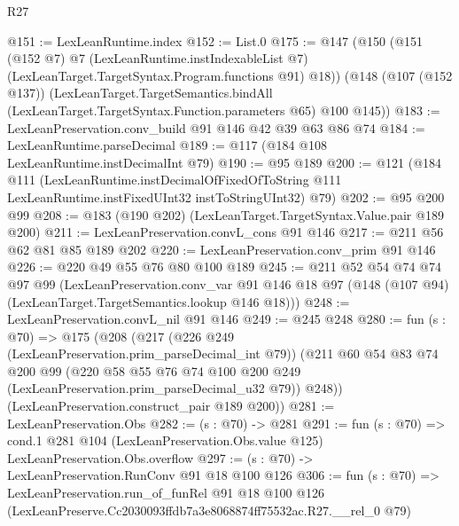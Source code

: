 \begin{lexlean}{R27}
\begin{coremodule}
@151 := LexLeanRuntime.index
@152 := List.{0}
@175 := @147
    (@150
      (@151
        (@152 @7)
        @7
        (LexLeanRuntime.instIndexableList @7)
        (LexLeanTarget.TargetSyntax.Program.functions @91)
        @18))
    (@148
      (@107 (@152 @137))
      (LexLeanTarget.TargetSemantics.bindAll
        (LexLeanTarget.TargetSyntax.Function.parameters @65)
        @100
        @145))
@183 := LexLeanPreservation.conv_build @91 @146 @42 @39 @63 @86 @74
@184 := LexLeanRuntime.parseDecimal
@189 := @117 (@184 @108 LexLeanRuntime.instDecimalInt @79)
@190 := @95 @189
@200 := @121
    (@184
      @111
      (LexLeanRuntime.instDecimalOfFixedOfToString
        @111
        LexLeanRuntime.instFixedUInt32
        instToStringUInt32)
      @79)
@202 := @95 @200 @99
@208 := @183 (@190 @202) (LexLeanTarget.TargetSyntax.Value.pair @189 @200)
@211 := LexLeanPreservation.convL_cons @91 @146
@217 := @211 @56 @62 @81 @85 @189 @202
@220 := LexLeanPreservation.conv_prim @91 @146
@226 := @220 @49 @55 @76 @80 @100 @189
@245 := @211
    @52
    @54
    @74
    @74
    @97
    @99
    (LexLeanPreservation.conv_var
      @91
      @146
      @18
      @97
      (@148 (@107 @94) (LexLeanTarget.TargetSemantics.lookup @146 @18)))
@248 := LexLeanPreservation.convL_nil @91 @146
@249 := @245 @248
@280 := fun (s : @70) =>
  @175
    (@208
      (@217
        (@226 @249 (LexLeanPreservation.prim_parseDecimal_int @79))
        (@211
          @60
          @54
          @83
          @74
          @200
          @99
          (@220 @58 @55 @76 @74 @100 @200 @249 (LexLeanPreservation.prim_parseDecimal_u32 @79))
          @248))
      (LexLeanPreservation.construct_pair @189 @200))
@281 := LexLeanPreservation.Obs
@282 := (s : @70) -> @281
@291 := fun (s : @70) =>
  cond.{1} @281 @104 (LexLeanPreservation.Obs.value @125) LexLeanPreservation.Obs.overflow
@297 := (s : @70) -> LexLeanPreservation.RunConv @91 @18 @100 @126
@306 := fun (s : @70) =>
  LexLeanPreservation.run_of_funRel
    @91
    @18
    @100
    @126
    (LexLeanPreserve.Cc2030093ffdb7a3e8068874ff75532ac.R27.__rel_0 @79)
\end{coremodule}
\end{lexlean}
